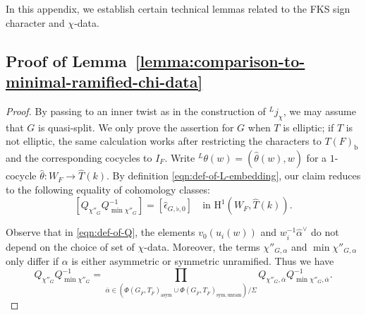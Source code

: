 \documentclass[reqno]{amsart}
\numberwithin{equation}{subsection}
\newcommand{\ol}[1]{\overline{#1}}
\newcommand{\wh}[1]{\widehat{#1}}
\newcommand{\co}{\colon}
\newcommand{\ld}{{}^L}
\newcommand{\rH}{\ensuremath{\mathrm{H}}\xspace}
\theoremstyle{remark}
\numberwithin{equation}{subsection}
\numberwithin{figure}{subsection}
\begin{document}
In this appendix, we establish certain technical lemmas related to the FKS sign character and $\chi$-data.






\subsection{Proof of Lemma~\ref{lemma:comparison-to-minimal-ramified-chi-data}}\label{app:comparison-minimal-proof}

\begin{proof}
By passing to an inner twist as in the construction of $\ld j_\chi$, we may assume that $G$ is quasi-split. We only prove the assertion for $G$ when $T$ is elliptic; if $T$ is not elliptic, the same calculation works after restricting the characters to $T(F)_{\mathrm b}$ and the corresponding cocycles to $I_F$. Write $\ld\theta(w)=(\wh\theta(w),w)$ for a $1$-cocycle $\wh\theta\co W_F\to\wh T(k)$.
By definition \eqref{eqn:def-of-L-embedding}, our claim reduces to the following equality of cohomology classes:
\begin{equation}\label{eqn:signs-cancel-1}
[Q_{\chi''_G}Q_{\min\chi''_G}^{-1}]=[\wh\epsilon_{G,\flat,0}]\quad\text{in }\rH^1(W_F, \wh T(k)).
\end{equation}

Observe that in \eqref{eqn:def-of-Q}, the elements $v_0(u_i(w))$ and $w_i^{-1}\wh\alpha^\vee$ do not depend on the choice of set of $\chi$-data. Moreover, the terms $\chi''_{G,\alpha}$ and $\min\chi''_{G,\alpha}$ only differ if $\alpha$ is either asymmetric or symmetric unramified. Thus we have
\[
Q_{\chi''_G}Q_{\min\chi''_G}^{-1} = \prod_{\ol\alpha \in (\Phi(G_{\ol F},T_{\ol F})_{\mathrm{asym}} \cup \Phi(G_{\ol F}, T_{\ol F})_{\mathrm{sym,unram}})/\Sigma} Q_{\chi''_G,\ol\alpha}Q_{\min\chi''_G,\ol\alpha}^{-1}.
\]


\end{proof}
\end{document}
